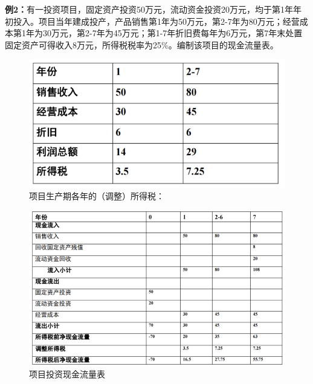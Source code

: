 \textbf{例2：}有一投资项目，固定资产投资50万元，流动资金投资20万元，均于第1年年初投入。项目当年建成投产，产品销售第1年为50万元，第2-7年为80万元；经营成本第1年为30万元，第2-7年为45万元；第1-7年折旧费每年为6万元，第7年末处置固定资产可得收入8万元，所得税税率为25\%。编制该项目的现金流量表。

\begin{figure}[H]
    \centering
    \caption{项目生产期各年的（调整）所得税：}
    \includegraphics[width=0.75\linewidth]{image/项目生产期各年的（调整）所得税.png}
\end{figure}

\begin{figure}[H]
    \centering
    \caption{项目投资现金流量表}
    \includegraphics[width=\linewidth]{image/项目投资现金流量表.png}
\end{figure}


